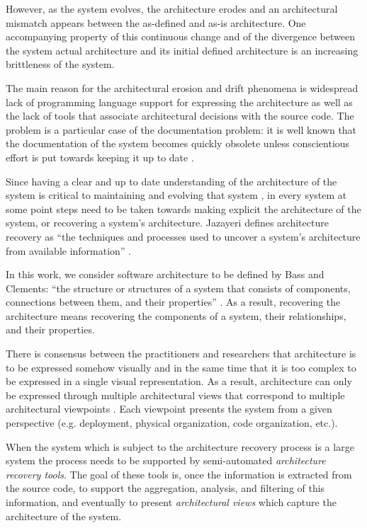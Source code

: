 \documentclass[preprint,12pt]{elsarticle}
\begin{document}
However, as the system evolves, the architecture erodes \cite{perry-foundations} and an architectural mismatch \cite{garlan-mismatch} appears between the as-defined and as-is architecture. One accompanying property of this continuous change and of the divergence between the system actual architecture and its initial defined architecture is an increasing brittleness of the system\cite{perry-foundations}.

The main reason for the architectural erosion and drift phenomena is widespread lack of programming language support for expressing the architecture as well as the lack of tools that associate architectural decisions with the source code. The problem is a particular case of the documentation problem: it is well known that the documentation of the system becomes quickly obsolete unless conscientious effort is put towards keeping it up to date \cite{riva-report}.

Since having a clear and up to date understanding of the architecture of the system is critical to maintaining and evolving that system \cite{pollet-sar}, in every system at some point steps need to be taken towards making explicit the architecture of the system, or recovering a system’s architecture. Jazayeri defines architecture recovery as ``the techniques and processes used to uncover a system’s architecture from available information'' \cite{jaza-archevo}.

In this work, we consider software architecture to be defined by Bass and Clements: ``the structure or structures of a system that consists of components, connections between them, and their properties'' \cite{bass-architecture}. As a result, recovering the architecture means recovering the components of a system, their relationships, and their properties. 

There is consensus between the practitioners and researchers that architecture is to be expressed somehow visually and in the same time that it is too complex to be expressed in a single visual representation. As a result, architecture can only be expressed through multiple architectural views that correspond to multiple architectural viewpoints \cite{kruchten-4plus}. Each viewpoint presents the system from a given perspective (e.g. deployment, physical organization, code organization, etc.).

When the system which is subject to the architecture recovery process is a large system the process needs to be supported by semi-automated {\em architecture recovery tools}. The goal of these tools is, once the information is extracted from the source code, to support the aggregation, analysis, and filtering of this information, and eventually to present {\em architectural views} which capture the architecture of the system. 
\end{document}
